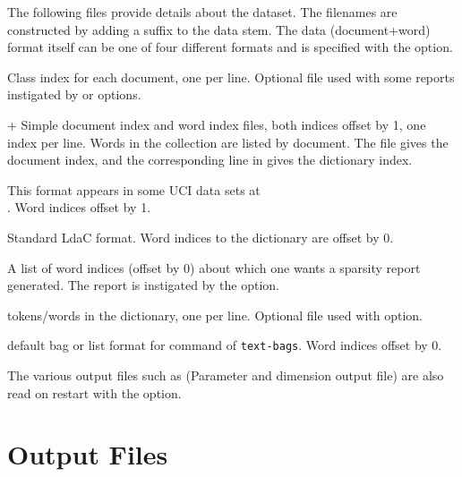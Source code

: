 \documentclass[a4paper,english]{article}
\begin{document}
The following files provide details about the dataset.
The filenames are constructed by adding a suffix to the data stem.
The data (document+word) format itself can be one of four different
formats and is specified with the  option.
\begin{Description}\setlength{\itemsep}{0cm}
\item[\File{DataStem.class}] Class index for each document, one per line.  
Optional file used with some reports instigated by
 or  options.
\item[\File{DataStem.dit}+\File{DataStem.wit}] Simple document index and word index files, both indices offset by 1, one index per line.  
Words in the collection are listed by document.  The  file
gives the document index, and the corresponding line in 
gives the dictionary index.  
\item[\File{DataStem.docword}] This format appears in some UCI data sets
at\\.
Word indices offset by 1.
\item[\File{DataStem.ldac}] Standard LdaC format.  Word indices to the dictionary are offset by 0.
\item[\File{DataStem.smap}] A list of word indices (offset by 0)
about which one wants a sparsity report generated.
The report is instigated by the
 option.
\item[\File{DataStem.tokens}] tokens/words in the dictionary, one per line.
Optional file used with  option.
\item[\File{DataStem.txtbag}] default bag or list format for  command of \texttt{text-bags}.  Word indices offset by 0.
\end{Description}

The various output files such as
 (Parameter and dimension output file)
are also read on restart with the  option.

\section{Output Files}
\end{document}
